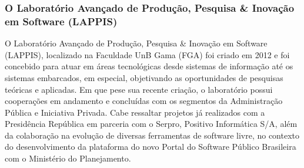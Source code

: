 % 
% 
% 
% 
% 
% 
% 
% 
% 
% 
% 

\subsubsection*{O Laboratório Avançado de Produção, Pesquisa \& Inovação em Software (LAPPIS)}

O Laboratório Avançado de Produção, Pesquisa \& Inovação em Software (LAPPIS),
localizado na Faculdade UnB Gama (FGA) foi criado em 2012 e foi concebido para
atuar em áreas tecnológicas desde sistemas de informação até os sistemas
embarcados, em especial, objetivando as oportunidades de pesquisas teóricas e
aplicadas.
%
Em que pese sua recente criação, o laboratório possui cooperações em andamento
e concluídas com os segmentos da Administração Pública e Iniciativa Privada.
Cabe ressaltar projetos já realizados com a Presidência República em parceria
com o Serpro, Positivo Informática S/A, além da colaboração na evolução de
diversas ferramentas de software livre, no contexto do desenvolvimento da
plataforma do novo Portal do Software Público Brasileira com o Ministério do
Planejamento.


